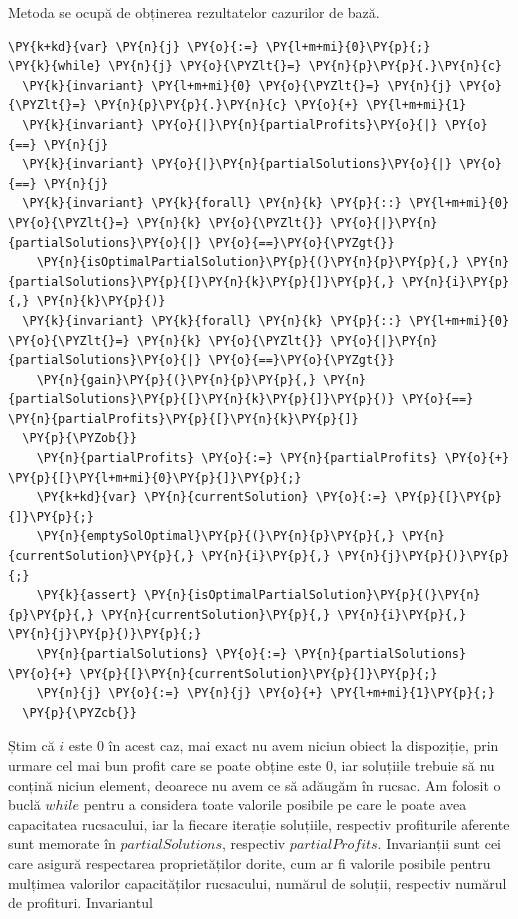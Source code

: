 \begin{sloppypar}
    Metoda  se ocupă de obținerea rezultatelor cazurilor de bază.
    \begin{Verbatim}[commandchars=\\\{\}]
\PY{k+kd}{var} \PY{n}{j} \PY{o}{:=} \PY{l+m+mi}{0}\PY{p}{;}
\PY{k}{while} \PY{n}{j} \PY{o}{\PYZlt{}=} \PY{n}{p}\PY{p}{.}\PY{n}{c}
  \PY{k}{invariant} \PY{l+m+mi}{0} \PY{o}{\PYZlt{}=} \PY{n}{j} \PY{o}{\PYZlt{}=} \PY{n}{p}\PY{p}{.}\PY{n}{c} \PY{o}{+} \PY{l+m+mi}{1}
  \PY{k}{invariant} \PY{o}{|}\PY{n}{partialProfits}\PY{o}{|} \PY{o}{==} \PY{n}{j}
  \PY{k}{invariant} \PY{o}{|}\PY{n}{partialSolutions}\PY{o}{|} \PY{o}{==} \PY{n}{j}
  \PY{k}{invariant} \PY{k}{forall} \PY{n}{k} \PY{p}{::} \PY{l+m+mi}{0} \PY{o}{\PYZlt{}=} \PY{n}{k} \PY{o}{\PYZlt{}} \PY{o}{|}\PY{n}{partialSolutions}\PY{o}{|} \PY{o}{==}\PY{o}{\PYZgt{}} 
    \PY{n}{isOptimalPartialSolution}\PY{p}{(}\PY{n}{p}\PY{p}{,} \PY{n}{partialSolutions}\PY{p}{[}\PY{n}{k}\PY{p}{]}\PY{p}{,} \PY{n}{i}\PY{p}{,} \PY{n}{k}\PY{p}{)}
  \PY{k}{invariant} \PY{k}{forall} \PY{n}{k} \PY{p}{::} \PY{l+m+mi}{0} \PY{o}{\PYZlt{}=} \PY{n}{k} \PY{o}{\PYZlt{}} \PY{o}{|}\PY{n}{partialSolutions}\PY{o}{|} \PY{o}{==}\PY{o}{\PYZgt{}} 
    \PY{n}{gain}\PY{p}{(}\PY{n}{p}\PY{p}{,} \PY{n}{partialSolutions}\PY{p}{[}\PY{n}{k}\PY{p}{]}\PY{p}{)} \PY{o}{==} \PY{n}{partialProfits}\PY{p}{[}\PY{n}{k}\PY{p}{]}
  \PY{p}{\PYZob{}}
    \PY{n}{partialProfits} \PY{o}{:=} \PY{n}{partialProfits} \PY{o}{+} \PY{p}{[}\PY{l+m+mi}{0}\PY{p}{]}\PY{p}{;}
    \PY{k+kd}{var} \PY{n}{currentSolution} \PY{o}{:=} \PY{p}{[}\PY{p}{]}\PY{p}{;}
    \PY{n}{emptySolOptimal}\PY{p}{(}\PY{n}{p}\PY{p}{,} \PY{n}{currentSolution}\PY{p}{,} \PY{n}{i}\PY{p}{,} \PY{n}{j}\PY{p}{)}\PY{p}{;}
    \PY{k}{assert} \PY{n}{isOptimalPartialSolution}\PY{p}{(}\PY{n}{p}\PY{p}{,} \PY{n}{currentSolution}\PY{p}{,} \PY{n}{i}\PY{p}{,} \PY{n}{j}\PY{p}{)}\PY{p}{;}
    \PY{n}{partialSolutions} \PY{o}{:=} \PY{n}{partialSolutions} \PY{o}{+} \PY{p}{[}\PY{n}{currentSolution}\PY{p}{]}\PY{p}{;}
    \PY{n}{j} \PY{o}{:=} \PY{n}{j} \PY{o}{+} \PY{l+m+mi}{1}\PY{p}{;}
  \PY{p}{\PYZcb{}}
\end{Verbatim}
    \par Știm că $i$ este $0$ în acest caz, mai exact nu avem niciun obiect la dispoziție, prin urmare cel mai bun profit care se poate obține este 0, iar soluțiile trebuie să nu conțină niciun element, deoarece nu avem ce să adăugăm în rucsac. Am folosit o buclă $while$ pentru a considera toate valorile posibile pe care le poate avea capacitatea rucsacului, iar la fiecare iterație soluțiile, respectiv profiturile aferente sunt memorate în $partialSolutions$, respectiv $partialProfits$. Invarianții sunt cei care asigură respectarea proprietăților dorite, cum ar fi valorile posibile pentru mulțimea valorilor capacităților rucsacului, numărul de soluții, respectiv numărul de profituri. Invariantul

\end{sloppypar}
